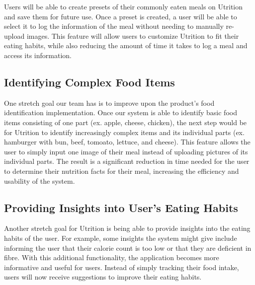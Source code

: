 \documentclass{article}
\begin{document}
Users will be able to create presets of their commonly eaten meals on Utrition 
and save them for future use. Once a preset is created, a user will be able to 
select it to log the information of the meal without needing to manually 
re-upload images. This feature will allow users to customize Utrition to fit 
their eating habits, while also reducing the amount of time it takes to log a 
meal and access its information.

\subsection{Identifying Complex Food Items}

One stretch goal our team has is to improve upon the product's food identification implementation. Once our system is able to identify basic food items consisting of one part (ex. apple, cheese, chicken), the next step would be for Utrition to identify increasingly complex items and its individual parts (ex. hamburger with bun, beef, tomoato, lettuce, and cheese). This feature allows the user to simply input one image of their meal instead of uploading pictures of its individual parts. The result is a significant reduction in time needed for the user to determine their nutrition facts for their meal, increasing the efficiency and usability of the system.

\subsection{Providing Insights into User's Eating Habits}

Another stretch goal for Utrition is being able to provide insights into the eating habits of the user. For example, some insights the system might give include informing the user that their calorie count is too low or that they are deficient in fibre. With this additional functionality, the application becomes more informative and useful for users. Instead of simply tracking their food intake, users will now receive suggestions to improve their eating habits.
\end{document}
